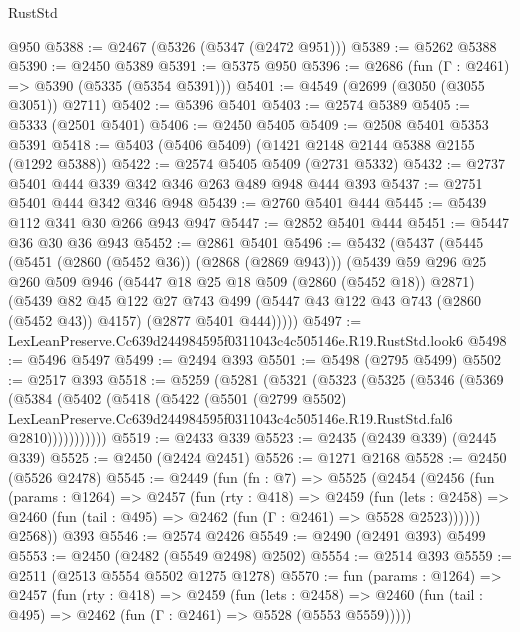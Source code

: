 \begin{lexlean}{RustStd}
\begin{coremodule}
    @950
@5388 := @2467 (@5326 (@5347 (@2472 @951)))
@5389 := @5262 @5388
@5390 := @2450 @5389
@5391 := @5375 @950
@5396 := @2686 (fun (Γ : @2461) => @5390 (@5335 (@5354 @5391)))
@5401 := @4549 (@2699 (@3050 (@3055 @3051)) @2711)
@5402 := @5396 @5401
@5403 := @2574 @5389
@5405 := @5333 (@2501 @5401)
@5406 := @2450 @5405
@5409 := @2508 @5401 @5353 @5391
@5418 := @5403 (@5406 @5409) (@1421 @2148 @2144 @5388 @2155 (@1292 @5388))
@5422 := @2574 @5405 @5409 (@2731 @5332)
@5432 := @2737 @5401 @444 @339 @342 @346 @263 @489 @948 @444 @393
@5437 := @2751 @5401 @444 @342 @346 @948
@5439 := @2760 @5401 @444
@5445 := @5439 @112 @341 @30 @266 @943 @947
@5447 := @2852 @5401 @444
@5451 := @5447 @36 @30 @36 @943
@5452 := @2861 @5401
@5496 := @5432
    (@5437
      (@5445
        (@5451 (@2860 (@5452 @36)) (@2868 (@2869 @943)))
        (@5439
          @59
          @296
          @25
          @260
          @509
          @946
          (@5447 @18 @25 @18 @509 (@2860 (@5452 @18)) @2871)
          (@5439
            @82
            @45
            @122
            @27
            @743
            @499
            (@5447 @43 @122 @43 @743 (@2860 (@5452 @43)) @4157)
            (@2877 @5401 @444)))))
@5497 := LexLeanPreserve.Cc639d244984595f0311043c4c505146e.R19.RustStd.look6
@5498 := @5496 @5497
@5499 := @2494 @393
@5501 := @5498 (@2795 @5499)
@5502 := @2517 @393
@5518 := @5259
    (@5281
      (@5321
        (@5323
          (@5325
            (@5346
              (@5369
                (@5384
                  (@5402
                    (@5418
                      (@5422
                        (@5501
                          (@2799 @5502)
                          LexLeanPreserve.Cc639d244984595f0311043c4c505146e.R19.RustStd.fal6
                          @2810)))))))))))
@5519 := @2433 @339
@5523 := @2435 (@2439 @339) (@2445 @339)
@5525 := @2450 (@2424 @2451)
@5526 := @1271 @2168
@5528 := @2450 (@5526 @2478)
@5545 := @2449
    (fun (fn : @7) =>
    @5525
      (@2454
        (@2456
          (fun (params : @1264) =>
          @2457
            (fun (rty : @418) =>
            @2459
              (fun (lets : @2458) =>
              @2460 (fun (tail : @495) => @2462 (fun (Γ : @2461) => @5528 @2523))))))
        @2568))
    @393
@5546 := @2574 @2426
@5549 := @2490 (@2491 @393) @5499
@5553 := @2450 (@2482 (@5549 @2498) @2502)
@5554 := @2514 @393
@5559 := @2511 (@2513 @5554 @5502 @1275 @1278)
@5570 := fun (params : @1264) =>
  @2457
    (fun (rty : @418) =>
    @2459
      (fun (lets : @2458) =>
      @2460 (fun (tail : @495) => @2462 (fun (Γ : @2461) => @5528 (@5553 @5559)))))

\end{coremodule}
\end{lexlean}
